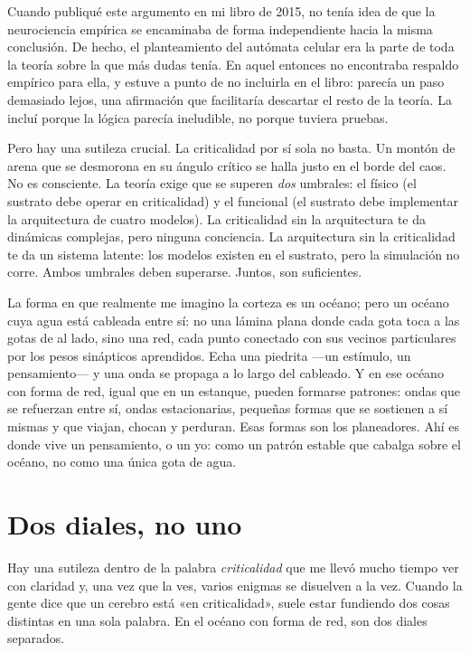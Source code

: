 \documentclass[11pt, twoside, openright]{book}
\begin{document}
Cuando publiqué este argumento en mi libro de 2015, no tenía idea de que la neurociencia empírica se encaminaba de forma independiente hacia la misma conclusión. De hecho, el planteamiento del autómata celular era la parte de toda la teoría sobre la que más dudas tenía. En aquel entonces no encontraba respaldo empírico para ella, y estuve a punto de no incluirla en el libro: parecía un paso demasiado lejos, una afirmación que facilitaría descartar el resto de la teoría. La incluí porque la lógica parecía ineludible, no porque tuviera pruebas.

Pero hay una sutileza crucial. La criticalidad por sí sola no basta. Un montón de arena que se desmorona en su ángulo crítico se halla justo en el borde del caos. No es consciente. La teoría exige que se superen \textit{dos} umbrales: el físico (el sustrato debe operar en criticalidad) y el funcional (el sustrato debe implementar la arquitectura de cuatro modelos). La criticalidad sin la arquitectura te da dinámicas complejas, pero ninguna conciencia. La arquitectura sin la criticalidad te da un sistema latente: los modelos existen en el sustrato, pero la simulación no corre. Ambos umbrales deben superarse. Juntos, son suficientes.

La forma en que realmente me imagino la corteza es un océano; pero un océano cuya agua está cableada entre sí: no una lámina plana donde cada gota toca a las gotas de al lado, sino una red, cada punto conectado con sus vecinos particulares por los pesos sinápticos aprendidos. Echa una piedrita ---un estímulo, un pensamiento--- y una onda se propaga a lo largo del cableado. Y en ese océano con forma de red, igual que en un estanque, pueden formarse patrones: ondas que se refuerzan entre sí, ondas estacionarias, pequeñas formas que se sostienen a sí mismas y que viajan, chocan y perduran. Esas formas son los planeadores. Ahí es donde vive un pensamiento, o un yo: como un patrón estable que cabalga sobre el océano, no como una única gota de agua.

\section*{Dos diales, no uno}

Hay una sutileza dentro de la palabra \textit{criticalidad} que me llevó mucho tiempo ver con claridad y, una vez que la ves, varios enigmas se disuelven a la vez. Cuando la gente dice que un cerebro está «en criticalidad», suele estar fundiendo dos cosas distintas en una sola palabra. En el océano con forma de red, son dos diales separados.
\end{document}
